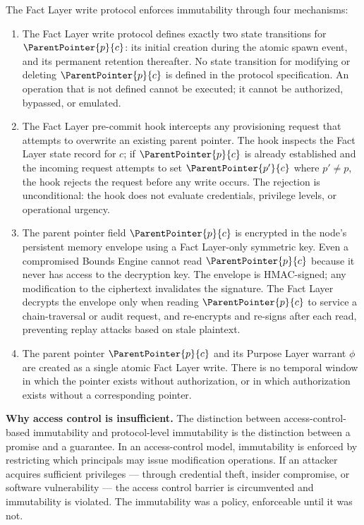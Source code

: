 The Fact Layer write protocol enforces immutability through four mechanisms:

\begin{enumerate}
    \item[(W1) \textbf{No modification operation defined.}] The Fact Layer write protocol defines exactly two state transitions for $\ParentPointer{p}{c}$: its initial creation during the atomic spawn event, and its permanent retention thereafter. No state transition for modifying or deleting $\ParentPointer{p}{c}$ is defined in the protocol specification. An operation that is not defined cannot be executed; it cannot be authorized, bypassed, or emulated.

    \item[(W2) \textbf{Pre-commit hook rejection.}] The Fact Layer pre-commit hook intercepts any provisioning request that attempts to overwrite an existing parent pointer. The hook inspects the Fact Layer state record for $c$; if $\ParentPointer{p}{c}$ is already established and the incoming request attempts to set $\ParentPointer{p'}{c}$ where $p' \neq p$, the hook rejects the request before any write occurs. The rejection is unconditional: the hook does not evaluate credentials, privilege levels, or operational urgency.

    \item[(W3) \textbf{Sealed memory envelope.}] The parent pointer field $\ParentPointer{p}{c}$ is encrypted in the node's persistent memory envelope using a Fact Layer-only symmetric key. Even a compromised Bounds Engine cannot read $\ParentPointer{p}{c}$ because it never has access to the decryption key. The envelope is HMAC-signed; any modification to the ciphertext invalidates the signature. The Fact Layer decrypts the envelope only when reading $\ParentPointer{p}{c}$ to service a chain-traversal or audit request, and re-encrypts and re-signs after each read, preventing replay attacks based on stale plaintext.

    \item[(W4) \textbf{Atomic provisioning.}] The parent pointer $\ParentPointer{p}{c}$ and its Purpose Layer warrant $\phi$ are created as a single atomic Fact Layer write. There is no temporal window in which the pointer exists without authorization, or in which authorization exists without a corresponding pointer.
\end{enumerate}

\medskip
\noindent\textbf{Why access control is insufficient.} The distinction between access-control-based immutability and protocol-level immutability is the distinction between a promise and a guarantee. In an access-control model, immutability is enforced by restricting which principals may issue modification operations. If an attacker acquires sufficient privileges — through credential theft, insider compromise, or software vulnerability — the access control barrier is circumvented and immutability is violated. The immutability was a policy, enforceable until it was not.

